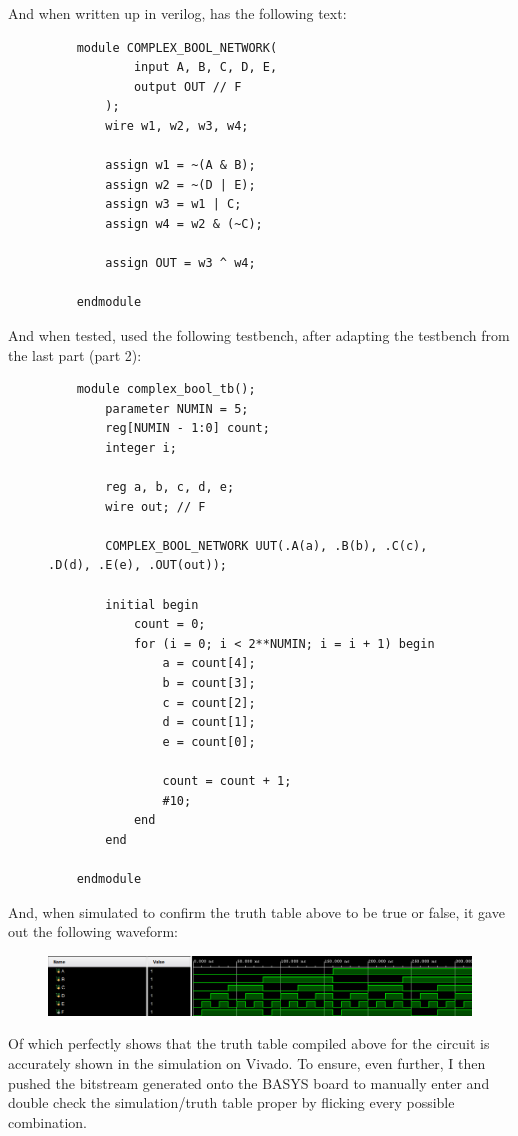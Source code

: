 And when written up in verilog, has the following text:
\begin{figure}[!htbp]
    \centering
    \begin{verbatim}
    module COMPLEX_BOOL_NETWORK(
            input A, B, C, D, E,
            output OUT // F
        );
        wire w1, w2, w3, w4;
        
        assign w1 = ~(A & B);
        assign w2 = ~(D | E);
        assign w3 = w1 | C;
        assign w4 = w2 & (~C);
        
        assign OUT = w3 ^ w4;
        
    endmodule
    \end{verbatim}
\end{figure}\newpage
And when tested, used the following testbench, after adapting the testbench from the last part (part 2):\\
\begin{figure}[!htbp]
    \centering
    \begin{verbatim}
    module complex_bool_tb();
        parameter NUMIN = 5;
        reg[NUMIN - 1:0] count;
        integer i;
        
        reg a, b, c, d, e;
        wire out; // F
        
        COMPLEX_BOOL_NETWORK UUT(.A(a), .B(b), .C(c), .D(d), .E(e), .OUT(out));
        
        initial begin
            count = 0;
            for (i = 0; i < 2**NUMIN; i = i + 1) begin
                a = count[4];
                b = count[3];
                c = count[2];
                d = count[1];
                e = count[0];
                
                count = count + 1;
                #10;
            end
        end
        
    endmodule
    \end{verbatim}
\end{figure}\newpage
And, when simulated to confirm the truth table above to be true or false, it gave out the following waveform:
\begin{figure}[!htbp]
    \centering
    \caption{}
    \includegraphics[width=1\textwidth]{part-3-wave.png}
    \label{Figure 2}
\end{figure}\newline
Of which perfectly shows that the truth table compiled above for the circuit is accurately shown in the simulation on Vivado. To ensure, even further, I then pushed the bitstream generated onto the BASYS board to manually enter and double check the simulation/truth table proper by flicking every possible combination.
\newpage

